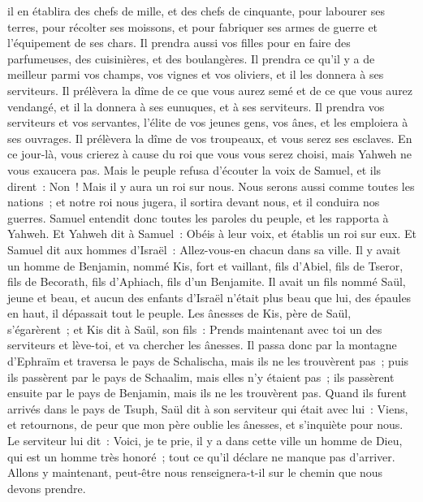 \begin{multicols}{2}
il en établira des chefs de mille, et des chefs de cinquante, pour labourer ses terres, pour récolter ses moissons, et pour fabriquer ses armes de guerre et l'équipement de ses chars.
Il prendra aussi vos filles pour en faire des parfumeuses, des cuisinières, et des boulangères.
Il prendra ce qu'il y a de meilleur parmi vos champs, vos vignes et vos oliviers, et il les donnera à ses serviteurs.
Il prélèvera la dîme de ce que vous aurez semé et de ce que vous aurez vendangé, et il la donnera à ses eunuques, et à ses serviteurs.
Il prendra vos serviteurs et vos servantes, l'élite de vos jeunes gens, vos ânes, et les emploiera à ses ouvrages.
Il prélèvera la dîme de vos troupeaux, et vous serez ses esclaves.
En ce jour-là, vous crierez à cause du roi que vous vous serez choisi, mais Yahweh ne vous exaucera pas.
Mais le peuple refusa d'écouter la voix de Samuel, et ils dirent~: Non~! Mais il y aura un roi sur nous.
Nous serons aussi comme toutes les nations~; et notre roi nous jugera, il sortira devant nous, et il conduira nos guerres.
Samuel entendit donc toutes les paroles du peuple, et les rapporta à Yahweh.
Et Yahweh dit à Samuel~: Obéis à leur voix, et établis un roi sur eux. Et Samuel dit aux hommes d'Israël~: Allez-vous-en chacun dans sa ville.
\VerseOne{}Il y avait un homme de Benjamin, nommé Kis, fort et vaillant, fils d'Abiel, fils de Tseror, fils de Becorath, fils d'Aphiach, fils d'un Benjamite.
Il avait un fils nommé Saül, jeune et beau, et aucun des enfants d'Israël n'était plus beau que lui, des épaules en haut, il dépassait tout le peuple.
Les ânesses de Kis, père de Saül, s'égarèrent~; et Kis dit à Saül, son fils~: Prends maintenant avec toi un des serviteurs et lève-toi, et va chercher les ânesses.
Il passa donc par la montagne d'Ephraïm et traversa le pays de Schalischa, mais ils ne les trouvèrent pas~; puis ils passèrent par le pays de Schaalim, mais elles n'y étaient pas~; ils passèrent ensuite par le pays de Benjamin, mais ils ne les trouvèrent pas.
Quand ils furent arrivés dans le pays de Tsuph, Saül dit à son serviteur qui était avec lui~: Viens, et retournons, de peur que mon père oublie les ânesses, et s'inquiète pour nous.
Le serviteur lui dit~: Voici, je te prie, il y a dans cette ville un homme de Dieu, qui est un homme très honoré~; tout ce qu'il déclare ne manque pas d'arriver. Allons y maintenant, peut-être nous renseignera-t-il sur le chemin que nous devons prendre.

\end{multicols}
